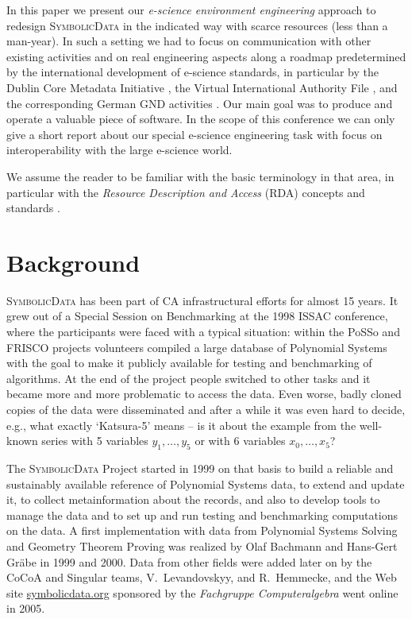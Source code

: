 \documentclass{svmult}
\newcommand{\SD}{\textsc{Symbolic\-Data}}
\begin{document}
In this paper we present our \emph{e-science environment engineering} approach
to redesign {\SD} in the indicated way with scarce resources (less than a
man-year).  In such a setting we had to focus on communication with other
existing activities and on real engineering aspects along a roadmap
predetermined by the international development of e-science standards, in
particular by the Dublin Core Metadata Initiative \cite{dc}, the Virtual
International Authority File \cite{VIAF}, and the corresponding German GND
activities \cite{GND}.  Our main goal was to produce and operate a valuable
piece of software. In the scope of this conference we can only give a short
report about our special e-science engineering task with focus on
interoperability with the large e-science world.

We assume the reader to be familiar with the basic terminology in that area,
in particular with the \emph{Resource Description and Access} (RDA) concepts
and standards \cite{RDA}.

\section{Background}

{\SD} has been part of CA infrastructural efforts for almost 15 years.  It
grew out of a Special Session on Benchmarking at the 1998 ISSAC conference,
where the participants were faced with a typical situation: within the PoSSo
and FRISCO projects volunteers compiled a large database of Polynomial Systems
with the goal to make it publicly available for testing and benchmarking of
algorithms.  At the end of the project people switched to other tasks and it
became more and more problematic to access the data.  Even worse, badly cloned
copies of the data were disseminated and after a while it was even hard to
decide, e.g., what exactly `Katsura-5' means -- is it about the example from
the well-known series with 5 variables $y_1,\dots,y_5$ or with 6 variables
$x_0,\dots,x_5$?

The {\SD} Project started in 1999 on that basis to build a reliable and
sustainably available reference of Polynomial Systems data, to extend and
update it, to collect metainformation about the records, and also to develop
tools to manage the data and to set up and run testing and benchmarking
computations on the data.  A first implementation with data from Polynomial
Systems Solving and Geometry Theorem Proving was realized by Olaf Bachmann and
Hans-Gert Gr\"abe in 1999 and 2000.  Data from other fields were added later
on by the CoCoA and Singular teams, V.~Levandovskyy, and R.~Hemmecke, and the
Web site \url{symbolicdata.org} sponsored by the \emph{Fachgruppe
  Computeralgebra} went online in 2005.
\end{document}
